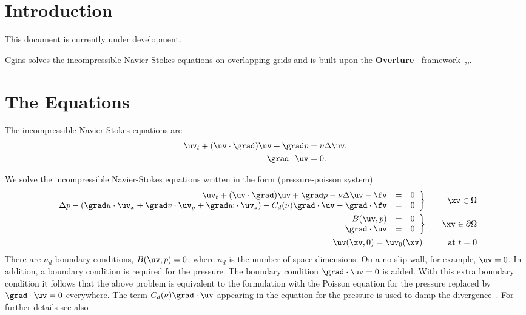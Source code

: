 \documentclass[12pt]{article}
\newcommand{\Index}[1]{#1\index{#1}}
\newcommand{\Overture}{{\bf Over\-ture\ }}
\begin{document}
\clearpage
\tableofcontents

\vfill\eject


\section{Introduction}

This document is currently under development. 


Cgins solves the incompressible Navier-Stokes equations
on overlapping grids and is built upon the \Overture 
framework~\cite{Brown97},\cite{Henshaw96a},\cite{iscope97}. 



\section{The Equations}


The incompressible Navier-Stokes equations are
\begin{align}
   \uv_t + (\uv\cdot\grad)\uv + \grad p &= \nu \Delta \uv, \\
   \grad\cdot\uv &= 0.
\end{align}

We solve the incompressible Navier-Stokes equations written in the
form (\Index{pressure-poisson system})
\begin{eqnarray}
 \left. \begin{array}{rcl}
  \uv_t + (\uv\cdot\grad)\uv + \grad p -\nu \Delta \uv -\fv &=&0
                                                \\
  \Delta p -(\grad u\cdot\uv_x + \grad v\cdot\uv_y + \grad w\cdot \uv_z)
     -C_d(\nu) \grad\cdot\uv    - \grad\cdot\fv  &=&0
        \end{array}\right\} && \xv\in\Omega       \\
 \left. \begin{array}{rcl}
        B(\uv,p) &=& 0   \\
   \grad\cdot\uv &=& 0
        \end{array}\right\} && \xv\in\partial\Omega  \nonumber \\
   \uv(\xv,0)  =  \uv_0(\xv)   ~&&~~~~\mbox{ at } t=0  \nonumber
\end{eqnarray}
There are $n_d$ boundary conditions, $B(\uv,p)=0$, where $n_d$ is
the number of space dimensions. On a no-slip wall, for example,
$\uv=0$. In addition, a boundary condition is required for the
pressure. The boundary condition $\grad\cdot\uv=0$ is added.
With this extra boundary condition it follows that the above problem
is equivalent to the formulation with the Poisson equation for
the pressure replaced by $\grad\cdot\uv=0$ everywhere. The term
$C_d(\nu) \grad\cdot\uv$ appearing in the equation for the
pressure is used to damp the divergence~\cite{INSDIV}.
For further details see also~\cite{ICSSI}
\end{document}
